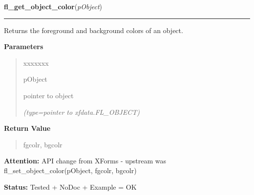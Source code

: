 \hspace{.8\funcindent}\begin{boxedminipage}{\funcwidth}

    \raggedright \textbf{fl\_get\_object\_color}(\textit{pObject})

    \vspace{-1.5ex}

    \rule{\textwidth}{0.5\fboxrule}
\setlength{\parskip}{2ex}
    Returns the foreground and background colors of an object.

\setlength{\parskip}{1ex}
      \textbf{Parameters}
      \vspace{-1ex}

      \begin{quote}
        \begin{Ventry}{xxxxxxx}

          \item[pObject]

          pointer to object

            {\it (type=pointer to xfdata.FL\_OBJECT)}

        \end{Ventry}

      \end{quote}

      \textbf{Return Value}
    \vspace{-1ex}

      \begin{quote}
      fgcolr, bgcolr

      \end{quote}

\textbf{Attention:} API change from XForms - upstream was fl\_set\_object\_color(pObject, 
fgcolr, bgcolr)



\textbf{Status:} Tested + NoDoc + Example = OK



    \end{boxedminipage}

    \label{xformslib:library:fl_set_object_label}

    \vspace{0.5ex}

